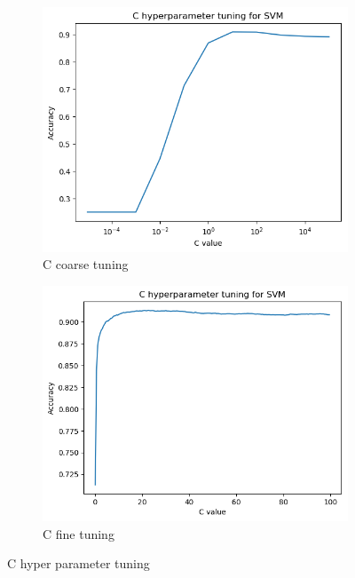 \documentclass[12pt]{article}
\begin{document}
\begin{figure}[h]
\centering
\begin{subfigure}{.5\textwidth}
  \centering
  \includegraphics[width=.6\linewidth]{Cross_valid_plots/SVM_C_hyper_fig_coarse.png}
  \caption{C coarse tuning}
  \label{fig:sub1}
\end{subfigure}%
\begin{subfigure}{.5\textwidth}
  \centering
  \includegraphics[width=.6\linewidth]{Cross_valid_plots/SVM_C_hyper_fig_fine.png}
  \caption{C fine tuning}
  \label{fig:sub2}
\end{subfigure}
\caption{C hyper parameter tuning}
\label{fig:test}
\end{figure}
\end{document}
